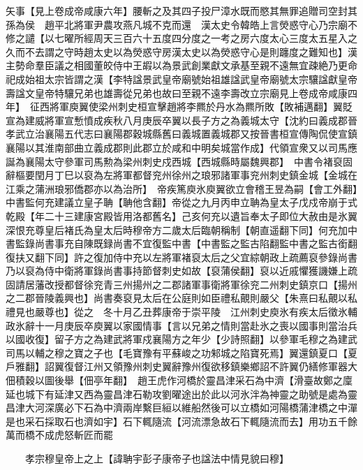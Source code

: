 矢事【見上卷成帝咸康六年】腰斬之及其四子投尸漳水既而愍其無罪追贈司空封其孫為侯　趙平北將軍尹農攻燕凡城不克而還　漢太史令韓皓上言熒惑守心乃宗廟不修之譴【以七曜所經周天三百六十五度四分度之一考之房六度太心三度太五星入之久而不去謂之守時趙太史以為熒惑守房漢太史以為熒惑守心是則躔度之難知也】漢主勢命羣臣議之相國董皎侍中王嘏以為景武創業獻文承基至親不遠無宜疎絶乃更命祀成始祖太宗皆謂之漢【李特諡景武皇帝廟號始祖雄諡武皇帝廟號太宗驤諡獻皇帝壽諡文皇帝特驤兄弟也雄壽從兄弟也故曰至親不遠李壽改立宗廟見上卷成帝咸康四年】　征西將軍庾翼使梁州刺史桓宣擊趙將李羆於丹水為羆所敗【敗補邁翻】翼貶宣為建威將軍宣慙憤成疾秋八月庚辰卒翼以長子方之為義城太守【沈約曰義成郡晉孝武立治襄陽五代志曰襄陽郡穀城縣舊曰義城置義城郡又按晉書桓宣傳陶侃使宣鎮襄陽以其淮南部曲立義成郡則此郡立於咸和中明矣城當作成】代領宣衆又以司馬應誕為襄陽太守參軍司馬勲為梁州刺史戍西城【西城縣時屬魏興郡】　中書令褚裒固辭樞要閏月丁巳以裒為左將軍都督兖州徐州之琅邪諸軍事兖州刺史鎮金城【金城在江乘之蒲洲琅邪僑郡亦以為治所】　帝疾篤庾氷庾翼欲立會稽王昱為嗣【會工外翻】中書監何充建議立皇子聃【聃他含翻】帝從之九月丙申立聃為皇太子戊戍帝崩于式乾殿【年二十三建康宮殿皆用洛都舊名】己亥何充以遺旨奉太子即位大赦由是氷翼深恨充尊皇后褚氏為皇太后時穆帝方二歲太后臨朝稱制【朝直遥翻下同】何充加中書監錄尚書事充自陳既録尚書不宜復監中書【中書監之監古陷翻監中書之監古銜翻復扶又翻下同】許之復加侍中充以左將軍褚裒太后之父宜綜朝政上疏薦裒參錄尚書乃以裒為侍中衛將軍錄尚書事持節督刺史如故【裒蒲侯翻】裒以近戚懼獲譏嫌上疏固請居藩改授都督徐兖青三州揚州之二郡諸軍事衛將軍徐兖二州刺史鎮京口【揚州之二郡晉陵義興也】尚書奏裒見太后在公庭則如臣禮私覿則嚴父【朱熹曰私覿以私禮見也嚴尊也】從之　冬十月乙丑葬康帝于崇平陵　江州刺史庾氷有疾太后徵氷輔政氷辭十一月庚辰卒庾翼以家國情事【言以兄弟之情則當赴氷之喪以國事則當治兵以國收復】留子方之為建武將軍戍襄陽方之年少【少詩照翻】以參軍毛穆之為建武司馬以輔之穆之寶之子也【毛寶豫有平蘇峻之功邾城之陷寶死焉】翼還鎮夏口【夏戶雅翻】詔翼復督江州又領豫州刺史翼辭豫州復欲移鎮樂鄉詔不許翼仍繕修軍器大佃積穀以圖後舉【佃亭年翻】　趙王虎作河橋於靈昌津采石為中濟【滑臺故鄭之廩延也城下有延津又西為靈昌津石勒攻劉曜途出於此以河氷泮為神靈之助號是處為靈昌津大河深廣必下石為中濟兩岸繫巨絙以維船然後可以立橋如河陽橋蒲津橋之中潬是也采石採取石也濟如宇】石下輒隨流【河流漂急故石下輒隨流而去】用功五千餘萬而橋不成虎怒斬匠而罷

　　孝宗穆皇帝上之上【諱聃宇彭子康帝子也諡法中情見貌曰穆】

